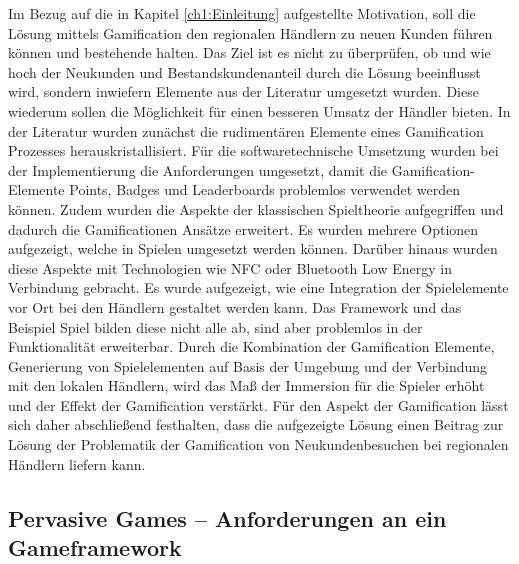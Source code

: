 Im Bezug auf die in Kapitel \ref{ch1:Einleitung} aufgestellte Motivation, soll die Lösung mittels Gamification den regionalen Händlern zu neuen Kunden führen können und bestehende halten. Das Ziel ist es nicht zu überprüfen, ob und wie hoch der Neukunden und Bestandskundenanteil durch die Lösung beeinflusst wird, sondern inwiefern Elemente aus der Literatur umgesetzt wurden. Diese wiederum sollen die Möglichkeit für einen besseren Umsatz der Händler bieten.
In der Literatur wurden zunächst die rudimentären Elemente eines Gamification Prozesses herauskristallisiert. Für die softwaretechnische Umsetzung wurden bei der Implementierung die Anforderungen umgesetzt, damit die Gamification-Elemente Points, Badges und Leaderboards problemlos verwendet werden können. Zudem wurden die Aspekte der klassischen Spieltheorie aufgegriffen und dadurch die Gamificationen Ansätze erweitert. Es wurden mehrere Optionen aufgezeigt, welche in Spielen umgesetzt werden können. Darüber hinaus wurden diese Aspekte mit Technologien wie NFC oder Bluetooth Low Energy in Verbindung gebracht. Es wurde aufgezeigt, wie eine Integration der Spielelemente vor Ort bei den Händlern gestaltet werden kann. Das Framework und das Beispiel Spiel bilden diese nicht alle ab, sind aber problemlos in der Funktionalität erweiterbar.
Durch die Kombination der Gamification Elemente, Generierung von Spielelementen auf Basis der Umgebung und der Verbindung mit den lokalen Händlern, wird das Maß der Immersion für die Spieler erhöht und der Effekt der Gamification verstärkt.
Für den Aspekt der Gamification lässt sich daher abschließend festhalten, dass die aufgezeigte Lösung einen Beitrag zur Lösung der Problematik der Gamification von Neukundenbesuchen bei regionalen Händlern liefern kann.

\subsection*{Pervasive Games  -- Anforderungen an ein Gameframework}

